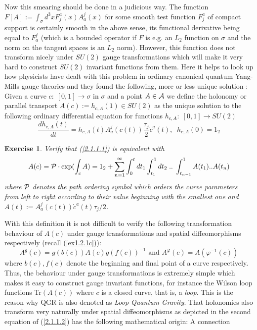 \documentclass[12pt]{report}
\newtheorem{Exercise}{Exercise}[section]
\def\be{\begin{equation}}
\def\ee{\end{equation}}
\def\a{{\cal A}}
\begin{document}
Now this smearing should be done in a judicious way. The function\\
$F[A]:=\int_\sigma d^3x F^a_j(x) A_a^j(x)$ for some smooth test 
function $F^a_j$ of compact support is certainly smooth
in the above sense, its functional derivative being equal to $F_a^j$
(which is a bounded operator if $F$ is e.g. an $L_2$ function on $\sigma$
and the norm on the tangent spaces is an $L_2$ norm). However, this 
function does not transform nicely
under $SU(2)$ gauge transformations which will make it very hard to 
construct $SU(2)$ invariant functions from them. Here it helps to look
up how physicists have dealt with this problem in ordinary 
canonical quantum Yang-Mills
gauge theories and they found the following, more or less unique
solution \cite{27}: \\
Given a curve $c:\;[0,1]\to \sigma$ in $\sigma$ and a point $A\in \a$ we 
define the holonomy or parallel transport $A(c):=h_{c,A}(1)\in SU(2)$ as 
the unique 
solution to the following ordinary differential equation for 
functions $h_{c,A}:\;[0,1]\to SU(2)$
\be \label{2.1.1.1}
\frac{d h_{c,A}(t)}{dt}=h_{c,A}(t) A_a^j(c(t))\frac{\tau_j}{2} 
\dot{c}^a(t),\;\;h_{c,A}(0)=1_2      
\ee
%
\begin{Exercise} \label{ex2.1.1.1}
Verify that (\ref{2.1.1.1}) is equivalent with 
\be \label{ex2.1.1.1a}
A(c)={\cal P}\cdot\exp(\int_c A)=1_2+\sum_{n=1}^\infty
\int_0^t dt_1\int_{t_1}^1 dt_2\;..\;\int_{t_{n-1}}^1
A(t_1)..A(t_n)
\ee
where $\cal P$ denotes the path ordering symbol which orders the 
curve parameters from left to right according to their value 
beginning with the smallest one and 
$A(t):=A_a^j(c(t))\dot{c}^a(t)\tau_j/2$.
\end{Exercise}
%
With this definition it is not difficult to verify the following 
transformation behaviour of $A(c)$ under gauge transformations and 
spatial diffeomorphisms respectively (recall (\ref{ex1.2.1c})):
\be \label{2.1.1.2}
A^g(c)=g(b(c)) A(c) g(f(c))^{-1} \mbox{ and }
A^\varphi(c)=A(\varphi^{-1}(c))
\ee
where $b(c),f(c)$ denote the beginning and final point of a curve 
respectively.
Thus, the behaviour under gauge transformations is extremely simple
which makes it easy to construct gauge invariant functions, for instance
the Wilson loop functions Tr$(A(c))$ where $c$ is a closed curve, that is,
a {\it loop}. This is the reason why QGR is also denoted as {\it Loop
Quantum Gravity}. That holonomies also transform very naturally 
under spatial diffeomorphisms as depicted in the second equation of 
(\ref{2.1.1.2}) has the following mathematical origin: A connection 
\end{document}
